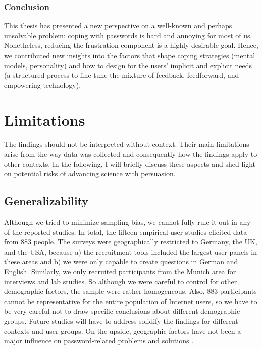 \subsubsection{Conclusion}
This thesis has presented a new perspective on a well-known and perhaps unsolvable problem: coping with passwords is hard and annoying for most of us. Nonetheless, reducing the frustration component is a highly desirable goal. Hence, we contributed new insights into the factors that shape coping strategies (mental models, personality) and how to design for the users' implicit and explicit needs (a structured process to fine-tune the mixture of feedback, feedforward, and empowering technology). 



\section{Limitations}
The findings should not be interpreted without context. Their main limitations arise from the way data was collected and consequently how the findings apply to other contexts. In the following, I will briefly discuss these aspects and shed light on potential risks of advancing science with persuasion. 

\subsection{Generalizability}
Although we tried to minimize sampling bias, we cannot fully rule it out in any of the reported studies. In total, the fifteen empirical user studies elicited data from 883 people. The surveys were geographically restricted to Germany, the UK, and the USA, because a) the recruitment tools included the largest user panels in these areas and b) we were only capable to create questions in German and English. Similarly, we only recruited participants from the Munich area for interviews and lab studies. So although we were careful to control for other demographic factors, the sample were rather homogeneous. Also, 883 participants cannot be representative for the entire population of Internet users, so we have to be very careful not to draw specific conclusions about different demographic groups. Future studies will have to address solidify the findings for different contexts and user groups. On the upside, geographic factors have not been a major influence on password-related problems and solutions \cite{Violettas2014PasswordsAvoidGreece, Wang2015ChinesePWs}. 

